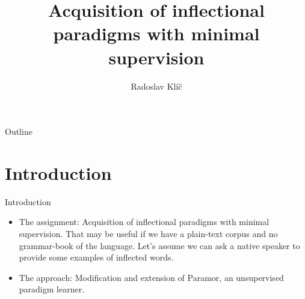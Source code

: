 \documentclass[hyperref={pdfencoding=unicode, unicode=true}, xcolor=dvipsnames]{beamer}
\title[Acquisition of inflectional paradigms]{Acquisition of inflectional paradigms with minimal supervision}
\author{Radoslav Klíč}
\institute{Seznam.cz a.s.}
\date{}
\begin{document}
{%


\begin{frame}
\titlepage
\end{frame}
}

\begin{frame}{Outline}
	\tableofcontents
\end{frame}

\section{Introduction}

\begin{frame}{Introduction}

\begin{itemize}
\item The assignment: Acquisition of inflectional paradigms with minimal supervision. That may be useful if we have a plain-text corpus and no grammar-book of the language. Let's assume we can ask a native speaker to provide some examples of inflected words.

\item The approach: Modification and extension of Paramor, an unsupervised paradigm learner.
\end{itemize}

\end{frame}
\end{document}
